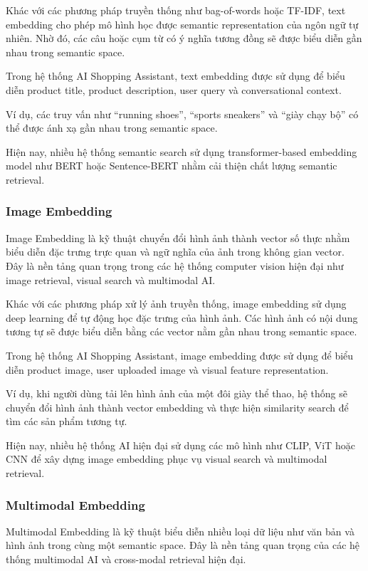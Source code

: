 Khác với các phương pháp truyền thống như bag-of-words hoặc TF-IDF, text embedding cho phép mô hình học được semantic representation của ngôn ngữ tự nhiên. Nhờ đó, các câu hoặc cụm từ có ý nghĩa tương đồng sẽ được biểu diễn gần nhau trong semantic space.

Trong hệ thống AI Shopping Assistant, text embedding được sử dụng để biểu diễn product title, product description, user query và conversational context.

Ví dụ, các truy vấn như ``running shoes'', ``sports sneakers'' và ``giày chạy bộ'' có thể được ánh xạ gần nhau trong semantic space.

Hiện nay, nhiều hệ thống semantic search sử dụng transformer-based embedding model như BERT hoặc Sentence-BERT nhằm cải thiện chất lượng semantic retrieval.
\subsubsection{Image Embedding}

Image Embedding là kỹ thuật chuyển đổi hình ảnh thành vector số thực nhằm biểu diễn đặc trưng trực quan và ngữ nghĩa của ảnh trong không gian vector. Đây là nền tảng quan trọng trong các hệ thống computer vision hiện đại như image retrieval, visual search và multimodal AI.

Khác với các phương pháp xử lý ảnh truyền thống, image embedding sử dụng deep learning để tự động học đặc trưng của hình ảnh. Các hình ảnh có nội dung tương tự sẽ được biểu diễn bằng các vector nằm gần nhau trong semantic space.

Trong hệ thống AI Shopping Assistant, image embedding được sử dụng để biểu diễn product image, user uploaded image và visual feature representation.

Ví dụ, khi người dùng tải lên hình ảnh của một đôi giày thể thao, hệ thống sẽ chuyển đổi hình ảnh thành vector embedding và thực hiện similarity search để tìm các sản phẩm tương tự.

Hiện nay, nhiều hệ thống AI hiện đại sử dụng các mô hình như CLIP, ViT hoặc CNN để xây dựng image embedding phục vụ visual search và multimodal retrieval.
\subsubsection{Multimodal Embedding}

Multimodal Embedding là kỹ thuật biểu diễn nhiều loại dữ liệu như văn bản và hình ảnh trong cùng một semantic space. Đây là nền tảng quan trọng của các hệ thống multimodal AI và cross-modal retrieval hiện đại.

